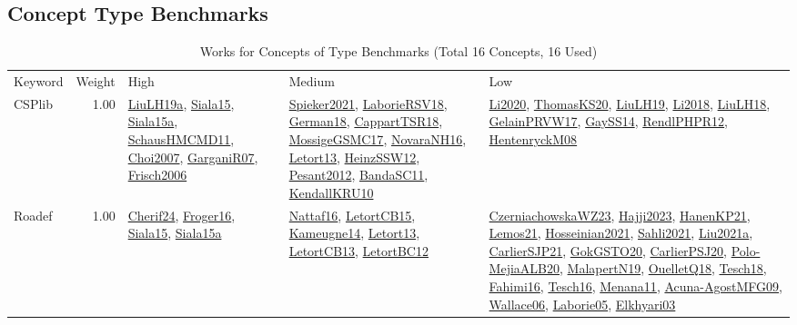 \subsection{Concept Type Benchmarks}
\label{sec:Benchmarks}
\label{Benchmarks}
{\scriptsize
\begin{longtable}{p{3cm}r>{\raggedright\arraybackslash}p{6cm}>{\raggedright\arraybackslash}p{6cm}>{\raggedright\arraybackslash}p{8cm}}
\rowcolor{white}\caption{Works for Concepts of Type Benchmarks (Total 16 Concepts, 16 Used)}\\ \toprule
\rowcolor{white}Keyword & Weight & High & Medium & Low\\ \midrule\endhead
\bottomrule
\endfoot
\index{CSPlib}\index{Benchmarks!CSPlib}CSPlib &  1.00 & \hyperref[detail:LiuLH19a]{LiuLH19a}, \hyperref[detail:Siala15]{Siala15}, \hyperref[detail:Siala15a]{Siala15a}, \hyperref[detail:SchausHMCMD11]{SchausHMCMD11}, \hyperref[detail:Choi2007]{Choi2007}, \hyperref[detail:GarganiR07]{GarganiR07}, \hyperref[detail:Frisch2006]{Frisch2006} & \hyperref[detail:Spieker2021]{Spieker2021}, \hyperref[detail:LaborieRSV18]{LaborieRSV18}, \hyperref[detail:German18]{German18}, \hyperref[detail:CappartTSR18]{CappartTSR18}, \hyperref[detail:MossigeGSMC17]{MossigeGSMC17}, \hyperref[detail:NovaraNH16]{NovaraNH16}, \hyperref[detail:Letort13]{Letort13}, \hyperref[detail:HeinzSSW12]{HeinzSSW12}, \hyperref[detail:Pesant2012]{Pesant2012}, \hyperref[detail:BandaSC11]{BandaSC11}, \hyperref[detail:KendallKRU10]{KendallKRU10} & \hyperref[detail:Li2020]{Li2020}, \hyperref[detail:ThomasKS20]{ThomasKS20}, \hyperref[detail:LiuLH19]{LiuLH19}, \hyperref[detail:Li2018]{Li2018}, \hyperref[detail:LiuLH18]{LiuLH18}, \hyperref[detail:GelainPRVW17]{GelainPRVW17}, \hyperref[detail:GaySS14]{GaySS14}, \hyperref[detail:RendlPHPR12]{RendlPHPR12}, \hyperref[detail:HentenryckM08]{HentenryckM08}\\
\index{Roadef}\index{Benchmarks!Roadef}Roadef &  1.00 & \hyperref[detail:Cherif24]{Cherif24}, \hyperref[detail:Froger16]{Froger16}, \hyperref[detail:Siala15]{Siala15}, \hyperref[detail:Siala15a]{Siala15a} & \hyperref[detail:Nattaf16]{Nattaf16}, \hyperref[detail:LetortCB15]{LetortCB15}, \hyperref[detail:Kameugne14]{Kameugne14}, \hyperref[detail:Letort13]{Letort13}, \hyperref[detail:LetortCB13]{LetortCB13}, \hyperref[detail:LetortBC12]{LetortBC12} & \hyperref[detail:CzerniachowskaWZ23]{CzerniachowskaWZ23}, \hyperref[detail:Hajji2023]{Hajji2023}, \hyperref[detail:HanenKP21]{HanenKP21}, \hyperref[detail:Lemos21]{Lemos21}, \hyperref[detail:Hosseinian2021]{Hosseinian2021}, \hyperref[detail:Sahli2021]{Sahli2021}, \hyperref[detail:Liu2021a]{Liu2021a}, \hyperref[detail:CarlierSJP21]{CarlierSJP21}, \hyperref[detail:GokGSTO20]{GokGSTO20}, \hyperref[detail:CarlierPSJ20]{CarlierPSJ20}, \hyperref[detail:Polo-MejiaALB20]{Polo-MejiaALB20}, \hyperref[detail:MalapertN19]{MalapertN19}, \hyperref[detail:OuelletQ18]{OuelletQ18}, \hyperref[detail:Tesch18]{Tesch18}, \hyperref[detail:Fahimi16]{Fahimi16}, \hyperref[detail:Tesch16]{Tesch16}, \hyperref[detail:Menana11]{Menana11}, \hyperref[detail:Acuna-AgostMFG09]{Acuna-AgostMFG09}, \hyperref[detail:Wallace06]{Wallace06}, \hyperref[detail:Laborie05]{Laborie05}, \hyperref[detail:Elkhyari03]{Elkhyari03}\\

\end{longtable}}
